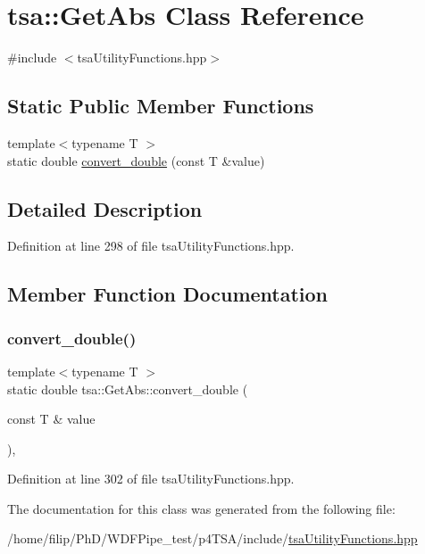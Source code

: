 \hypertarget{classtsa_1_1_get_abs}{}\section{tsa\+:\+:Get\+Abs Class Reference}
\label{classtsa_1_1_get_abs}


{\ttfamily \#include $<$tsa\+Utility\+Functions.\+hpp$>$}

\subsection*{Static Public Member Functions}
\begin{DoxyCompactItemize}
\item 
{\footnotesize template$<$typename T $>$ }\\static double \hyperlink{classtsa_1_1_get_abs_a2297ebfbeb4294d0569d0772328a6890}{convert\+\_\+double} (const T \&value)
\end{DoxyCompactItemize}


\subsection{Detailed Description}


Definition at line 298 of file tsa\+Utility\+Functions.\+hpp.



\subsection{Member Function Documentation}
\mbox{\label{classtsa_1_1_get_abs_a2297ebfbeb4294d0569d0772328a6890}} 
\subsubsection{\texorpdfstring{convert\+\_\+double()}{convert\_double()}}
{\footnotesize\ttfamily template$<$typename T $>$ \\
static double tsa\+::\+Get\+Abs\+::convert\+\_\+double (\begin{DoxyParamCaption}\item[{const T \&}]{value }\end{DoxyParamCaption})\hspace{0.3cm}{\ttfamily [inline]}, {\ttfamily [static]}}



Definition at line 302 of file tsa\+Utility\+Functions.\+hpp.



The documentation for this class was generated from the following file\+:\begin{DoxyCompactItemize}
\item 
/home/filip/\+Ph\+D/\+W\+D\+F\+Pipe\+\_\+test/p4\+T\+S\+A/include/\hyperlink{tsa_utility_functions_8hpp}{tsa\+Utility\+Functions.\+hpp}\end{DoxyCompactItemize}
